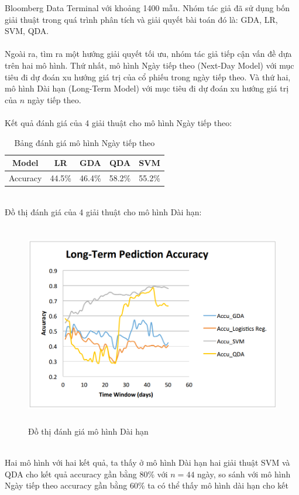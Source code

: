 Bloomberg Data Terminal với khoảng 1400 mẫu. Nhóm tác giả đã sử dụng bốn 
giải thuật trong quá trình phân tích và giải quyết bài toán đó là: GDA, LR, SVM, 
QDA.\\\\
Ngoài ra, tìm ra một hướng giải quyết tối ưu, nhóm tác giả tiếp cận vấn đề dựa 
trên hai mô hình. Thứ nhất, mô hình Ngày tiếp theo (Next-Day Model) với mục 
tiêu đi dự đoán xu hướng giá trị của cổ phiếu trong ngày tiếp theo. Và thứ hai, 
mô hình Dài hạn (Long-Term Model) với mục tiêu đi dự đoán xu hướng giá trị của 
$n$ ngày tiếp theo.\\\\
Kết quả đánh giá của 4 giải thuật cho mô hình Ngày tiếp theo:
\begin{table}[h]
\centering
\begin{tabular}{ |c|c|c|c|c| }
\hline
Model & LR & GDA & QDA & SVM \\
\hline
Accuracy & 44.5\% & 46.4\% & 58.2\% & 55.2\% \\
\hline
\end{tabular}
\caption{Bảng đánh giá mô hình Ngày tiếp theo }
\end{table}\\
Đồ thị đánh giá của 4 giải thuật cho mô hình Dài hạn:
\begin{figure}[h!]
\centering
\includegraphics[height=3.5in, keepaspectratio=true]{longtermmodel.png}
\caption{Đồ thị đánh giá mô hình Dài hạn}
\end{figure}\\
Hai mô hình với hai kết quả, ta thấy ở mô hình Dài hạn hai giải thuật SVM và 
QDA cho kết quả accuracy gần bằng 80\% với $n=44$ ngày, so sánh với mô hình 
Ngày tiếp theo accuracy gần bằng 60\% ta có thể thấy mô hình dài hạn cho kết 
